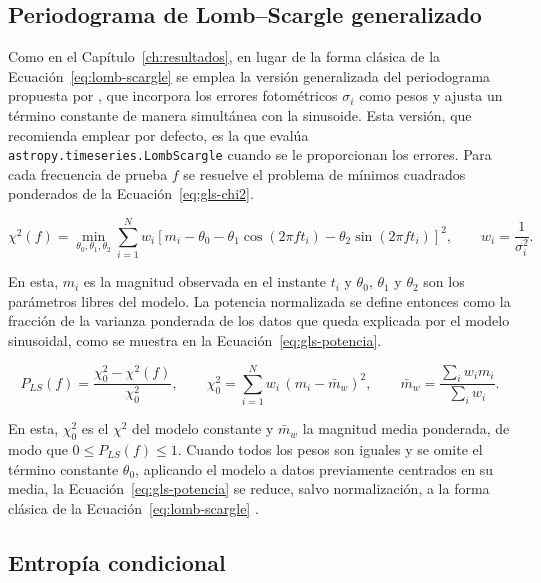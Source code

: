 \documentclass[12pt,letterpaper,oneside]{book}
\begin{document}
\subsection{Periodograma de Lomb--Scargle generalizado}

Como en el Cap\'itulo~\ref{ch:resultados}, en lugar de la forma cl\'asica de la Ecuaci\'on~\eqref{eq:lomb-scargle} se emplea la versi\'on generalizada del periodograma propuesta por \citet{Zechmeister2009}, que incorpora los errores fotom\'etricos $\sigma_i$ como pesos y ajusta un t\'ermino constante de manera simult\'anea con la sinusoide. Esta versi\'on, que \citet{VanderPlas2018} recomienda emplear por defecto, es la que eval\'ua \texttt{astropy.\allowbreak timeseries.\allowbreak LombScargle} \citep{astropy} cuando se le proporcionan los errores. Para cada frecuencia de prueba $f$ se resuelve el problema de m\'inimos cuadrados ponderados de la Ecuaci\'on~\eqref{eq:gls-chi2}.

\begin{equation}
	\chi^2(f) = \operatorname*{min}_{\theta_0,\theta_1,\theta_2} \sum_{i=1}^{N} w_i \left[ m_i - \theta_0 - \theta_1\cos(2\pi f t_i) - \theta_2\sin(2\pi f t_i) \right]^2, \qquad w_i = \frac{1}{\sigma_i^2}.
	\label{eq:gls-chi2}
\end{equation}

En esta, $m_i$ es la magnitud observada en el instante $t_i$ y $\theta_0$, $\theta_1$ y $\theta_2$ son los par\'ametros libres del modelo. La potencia normalizada se define entonces como la fracci\'on de la varianza ponderada de los datos que queda explicada por el modelo sinusoidal, como se muestra en la Ecuaci\'on~\eqref{eq:gls-potencia}.

\begin{equation}
	P_{LS}(f) = \frac{\chi^2_0 - \chi^2(f)}{\chi^2_0}, \qquad \chi^2_0 = \sum_{i=1}^{N} w_i\,(m_i - \bar m_w)^2, \qquad \bar m_w = \frac{\sum_i w_i m_i}{\sum_i w_i}.
	\label{eq:gls-potencia}
\end{equation}

En esta, $\chi^2_0$ es el $\chi^2$ del modelo constante y $\bar m_w$ la magnitud media ponderada, de modo que $0\leq P_{LS}(f)\leq1$. Cuando todos los pesos son iguales y se omite el t\'ermino constante $\theta_0$, aplicando el modelo a datos previamente centrados en su media, la Ecuaci\'on~\eqref{eq:gls-potencia} se reduce, salvo normalizaci\'on, a la forma cl\'asica de la Ecuaci\'on~\eqref{eq:lomb-scargle} \citep{Zechmeister2009,VanderPlas2018}.

\subsection{Entrop\'ia condicional}
\label{sec:hibrido-entropia-condicional}
\end{document}
